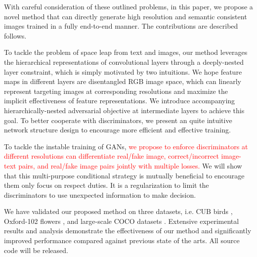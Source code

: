 \documentclass[10pt,twocolumn,letterpaper]{article}
\begin{document}

With careful consideration of these outlined problems, in this paper, we propose a novel method that can directly generate high resolution and semantic consistent images trained in a fully end-to-end manner. The contributions are described follows.

To tackle the problem of space leap from text and images, our method leverages the hierarchical representations of convolutional layers through a deeply-nested layer constraint, which is simply motivated by two intuitions. 
We hope feature maps in different layers are disentangled RGB image space, which can linearly represent targeting images at corresponding resolutions and maximize the implicit effectiveness of feature representations.
We introduce accompanying hierarchically-nested adversarial objective at intermediate layers to achieve this goal. To better cooperate with discriminators, we present an quite intuitive network structure design to encourage more efficient and effective training.

To tackle the instable training of GANs, 
\textcolor{red}{we propose to enforce discriminators at different resolutions can differentiate real/fake image, correct/incorrect image-text pairs, and real/fake image pairs jointly with multiple losses.} We will show that this multi-purpose conditional strategy is mutually beneficial to encourage them only focus on respect duties. It is a regularization to limit the discriminators to use unexpected information to make decision. 

We have validated our proposed method on three datasets, i.e. CUB birds \cite{}, Oxford-102 flowers \cite{}, and large-scale COCO datasets \cite{}. Extensive experimental results and analysis demonstrate the effectiveness of our method and significantly improved performance compared against previous state of the arts. All source code will be released.
\end{document}
